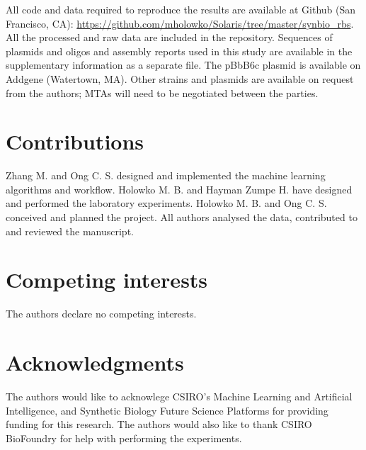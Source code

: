 \documentclass{article}
\begin{document}
All code and data required to reproduce the results are available at Github (San Francisco, CA): \url{https://github.com/mholowko/Solaris/tree/master/synbio_rbs}.
All the processed and raw data are included in the repository.
Sequences of plasmids and oligos and assembly reports used in this study are available in the supplementary information as a separate file.
The pBbB6c plasmid is available on Addgene (Watertown, MA). Other strains and plasmids are available on request from the authors; MTAs will need to be negotiated between the parties.


\section*{Contributions}
Zhang M. and Ong C. S. designed and implemented the machine learning algorithms and workflow. Holowko M. B. and Hayman Zumpe H. have designed and performed the laboratory experiments. Holowko M. B. and Ong C. S. conceived and planned the project. All authors analysed the data, contributed to and reviewed the manuscript.

\section*{Competing interests}
The authors declare no competing interests.

\section*{Acknowledgments}
The authors would like to acknowlege CSIRO's Machine Learning and Artificial Intelligence, and Synthetic Biology Future Science Platforms for providing funding for this research. The authors would also like to thank CSIRO BioFoundry for help with performing the experiments.


\newpage

\printbibliography

\clearpage

\setcounter{figure}{0}
\makeatletter
\renewcommand{\thefigure}{S\@arabic\c@figure}
\makeatother
\appendix

\end{document}
